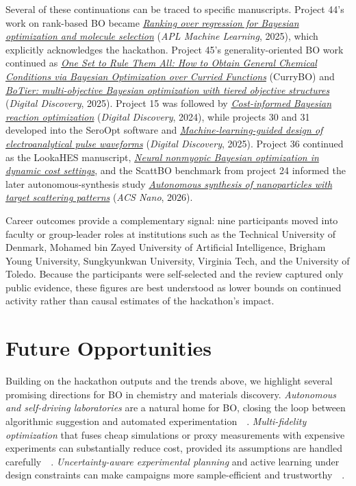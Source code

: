 \documentclass[superscriptaddress, nofootinbib,  amsmath, amssymb, twocolumn]{revtex4-2} %
\let\originalcite\cite
\renewcommand{\cite}[1]{\unskip~\originalcite{#1}}
\begin{document}
Several of these continuations can be traced to specific manuscripts. Project 44's work on rank-based BO became \href{https://doi.org/10.1063/5.0272663}{\emph{Ranking over regression for Bayesian optimization and molecule selection}} (\emph{APL Machine Learning}, 2025), which explicitly acknowledges the hackathon. Project 45's generality-oriented BO work continued as \href{https://arxiv.org/abs/2502.18966}{\emph{One Set to Rule Them All: How to Obtain General Chemical Conditions via Bayesian Optimization over Curried Functions}} (CurryBO) and \href{https://doi.org/10.1039/D5DD00039D}{\emph{BoTier: multi-objective Bayesian optimization with tiered objective structures}} (\emph{Digital Discovery}, 2025). Project 15 was followed by \href{https://doi.org/10.1039/D4DD00225C}{\emph{Cost-informed Bayesian reaction optimization}} (\emph{Digital Discovery}, 2024), while projects 30 and 31 developed into the SeroOpt software and \href{https://doi.org/10.1039/D5DD00005J}{\emph{Machine-learning-guided design of electroanalytical pulse waveforms}} (\emph{Digital Discovery}, 2025). Project 36 continued as the LookaHES manuscript, \href{https://arxiv.org/abs/2601.06505}{\emph{Neural nonmyopic Bayesian optimization in dynamic cost settings}}, and the ScattBO benchmark from project 24 informed the later autonomous-synthesis study \href{https://doi.org/10.1021/acsnano.5c15488}{\emph{Autonomous synthesis of nanoparticles with target scattering patterns}} (\emph{ACS Nano}, 2026).

Career outcomes provide a complementary signal: nine participants moved into faculty or group-leader roles at institutions such as the Technical University of Denmark, Mohamed bin Zayed University of Artificial Intelligence, Brigham Young University, Sungkyunkwan University, Virginia Tech, and the University of Toledo. Because the participants were self-selected and the review captured only public evidence, these figures are best understood as lower bounds on continued activity rather than causal estimates of the hackathon's impact.

\section{Future Opportunities}
\label{sec:future}

Building on the hackathon outputs and the trends above, we highlight several promising directions for BO in chemistry and materials discovery. \emph{Autonomous and self-driving laboratories} are a natural home for BO, closing the loop between algorithmic suggestion and automated experimentation~\cite{tom_self-driving_2024, abolhasani_rise_2023}. \emph{Multi-fidelity optimization} that fuses cheap simulations or proxy measurements with expensive experiments can substantially reduce cost, provided its assumptions are handled carefully~\cite{sabanza-gil_best_2025, judge_applying_2024}. \emph{Uncertainty-aware experimental planning} and active learning under design constraints can make campaigns more sample-efficient and trustworthy~\cite{low_evolution_2024}.
\end{document}
